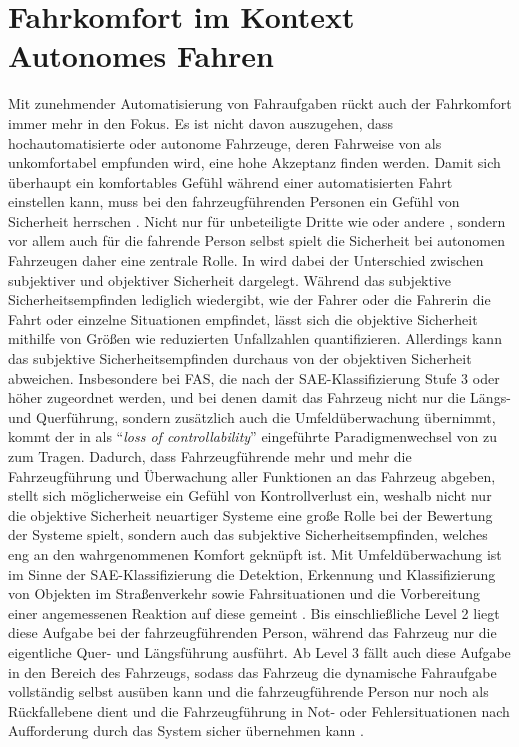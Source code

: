 \section{Fahrkomfort im Kontext Autonomes Fahren}\label{sec:fahrkomfort}
Mit zunehmender Automatisierung von Fahraufgaben rückt auch der Fahrkomfort immer mehr in den Fokus. Es ist nicht davon auszugehen, dass hochautomatisierte oder autonome Fahrzeuge, deren Fahrweise von  als unkomfortabel empfunden wird, eine hohe Akzeptanz finden werden. Damit sich überhaupt ein komfortables Gefühl während einer automatisierten Fahrt einstellen kann, muss bei den fahrzeugführenden Personen ein Gefühl von Sicherheit herrschen \cite{Festner.2019}. Nicht nur für unbeteiligte Dritte wie  oder andere , sondern vor allem auch für die fahrende Person selbst spielt die Sicherheit bei autonomen Fahrzeugen daher eine zentrale Rolle. In \cite{Festner.2019} wird dabei der Unterschied zwischen subjektiver und objektiver Sicherheit dargelegt. Während das subjektive Sicherheitsempfinden lediglich wiedergibt, wie der Fahrer oder die Fahrerin die Fahrt oder einzelne Situationen empfindet, lässt sich die objektive Sicherheit mithilfe von Größen wie reduzierten Unfallzahlen quantifizieren. Allerdings kann das subjektive Sicherheitsempfinden durchaus von der objektiven Sicherheit abweichen. Insbesondere bei FAS, die nach der SAE-Klassifizierung \cite{SAETaxonomy.2018} Stufe 3 oder höher zugeordnet werden, und bei denen damit das Fahrzeug nicht nur die Längs- und Querführung, sondern zusätzlich auch die Umfeldüberwachung übernimmt, kommt der in \cite{Elbanhawi.2015} als ``\textit{loss of controllability}'' eingeführte Paradigmenwechsel von  zu  zum Tragen. Dadurch, dass Fahrzeugführende mehr und mehr die Fahrzeugführung und Überwachung aller Funktionen an das Fahrzeug abgeben, stellt sich möglicherweise ein Gefühl von Kontrollverlust ein, weshalb nicht nur die objektive Sicherheit neuartiger Systeme eine große Rolle bei der Bewertung der Systeme spielt, sondern auch das subjektive Sicherheitsempfinden, welches eng an den wahrgenommenen Komfort geknüpft ist. Mit Umfeldüberwachung ist im Sinne der SAE-Klassifizierung die Detektion, Erkennung und Klassifizierung von Objekten im Straßenverkehr sowie Fahrsituationen und die Vorbereitung einer angemessenen Reaktion auf diese gemeint \cite{SAETaxonomy.2018}. Bis einschließliche Level 2 liegt diese Aufgabe bei der fahrzeugführenden Person, während das Fahrzeug nur die eigentliche Quer- und Längsführung ausführt. Ab Level 3 fällt auch diese Aufgabe in den Bereich des Fahrzeugs, sodass das Fahrzeug die dynamische Fahraufgabe vollständig selbst ausüben kann und die fahrzeugführende Person nur noch als Rückfallebene dient und die Fahrzeugführung in Not- oder Fehlersituationen nach Aufforderung durch das System sicher übernehmen kann \cite{SAETaxonomy.2018}.

